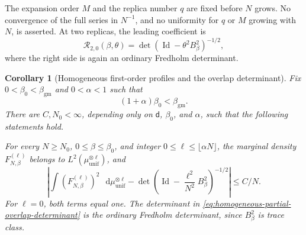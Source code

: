 \documentclass[11pt,reqno]{amsart}
\numberwithin{equation}{section}
\theoremstyle{plain}
\newtheorem{cor}[cor]{Corollary}
\theoremstyle{definition}
\renewcommand{\d}{\mathsf d}
\newcommand{\dd}{\mathop{}\!\mathrm d}
\newcommand{\Id}{\operatorname{Id}}
\newcommand{\be}{\beta}
\newcommand{\muunif}{\mu_{\mathrm{unif}}}
\newcommand{\gm}{\mathrm{gm}}
\begin{document}
The expansion order $M$ and the replica number $q$ are fixed before $N$ grows.  No convergence of the full series in $N^{-1}$, and no uniformity for $q$ or $M$ growing with $N$, is asserted.  At two replicas, the leading coefficient is
\begin{equation}
 \mathcal R_{2,0}(\be,\theta)
 =\det(\Id-\theta^2B_{\be}^2)^{-1/2},
 \label{eq:higher-order-two-replica-determinant}
\end{equation}
where the right side is again an ordinary Fredholm determinant.

\begin{cor}[Homogeneous first-order profiles and the overlap determinant]
\label{thm:homogeneous-local-chaos}
Fix $0<\be_0<\beta_{\gm}$ and $0<\alpha<1$ such that
\begin{equation}
 (1+\alpha)\be_0<\beta_{\gm}.
 \label{eq:homogeneous-replica-window}
\end{equation}
There are $C,N_0<\infty$, depending only on $\d$, $\be_0$, and $\alpha$, such that the following statements hold.

For every $N\geq N_0$, $0\leq\be\leq\be_0$, and integer $0\leq\ell\leq\lfloor\alpha N\rfloor$, the marginal density $F_{N,\be}^{(\ell)}$ belongs to $L^2(\muunif^{\otimes\ell})$, and
\begin{equation}
 \left|\int\left(F_{N,\be}^{(\ell)}\right)^2\,\dd\muunif^{\otimes\ell}
 -\det\!\left(\Id-\frac{\ell^2}{N^2}B_{\be}^2\right)^{-1/2}\right|
 \leq C/N.
 \label{eq:homogeneous-partial-overlap-determinant}
\end{equation}
For $\ell=0$, both terms equal one.  The determinant in \eqref{eq:homogeneous-partial-overlap-determinant} is the ordinary Fredholm determinant, since $B_{\be}^2$ is trace class.


\end{cor}
\end{document}

